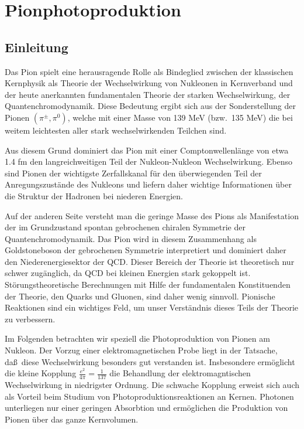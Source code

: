 \chapter{Pionphotoproduktion}
\section{Einleitung}
Das Pion spielt eine herausragende Rolle als Bindeglied zwischen 
der klassischen Kernphysik als Theorie der Wechselwirkung von 
Nukleonen in Kernverband und der heute anerkannten fundamentalen
Theorie der starken Wechselwirkung, der Quantenchromodynamik.  
Diese Bedeutung ergibt sich aus der Sonderstellung der Pionen
$(\pi^\pm,\pi^0)$, welche mit einer Masse von 139 MeV (bzw.~135 MeV)
die bei weitem leichtesten aller stark wechselwirkenden
Teilchen sind. 

Aus diesem Grund dominiert das Pion mit einer Comptonwellenl\"ange
von etwa 1.4 fm den langreichweitigen Teil der Nukleon-Nukleon
Wechselwirkung. Ebenso sind Pionen der wichtigste Zerfallskanal
f\"ur den \"uberwiegenden Teil der Anregungszust\"ande des
Nukleons und liefern daher wichtige Informationen \"uber
die  Struktur der Hadronen bei niederen Energien.

Auf der anderen Seite versteht man die geringe Masse des Pions
als Manifestation der im Grundzustand spontan 
gebrochenen chiralen Symmetrie der Quantenchromodynamik.
Das Pion wird in diesem Zusammenhang als Goldstoneboson der
gebrochenen Symmetrie interpretiert und dominiert daher
den Niederenergiesektor der QCD. Dieser Bereich der Theorie
ist theoretisch nur schwer zug\"anglich, da QCD bei kleinen
Energien stark gekoppelt ist. St\"orungstheoretische
Berechnungen mit Hilfe der fundamentalen Konstituenden der Theorie, den
Quarks und Gluonen, sind daher wenig sinnvoll. Pionische 
Reaktionen  sind ein wichtiges Feld, um 
unser Verst\"andnis dieses Teils der Theorie zu verbessern.

Im Folgenden betrachten wir speziell die Photoproduktion 
von Pionen am Nukleon. Der Vorzug einer elektromagnetischen 
Probe liegt in der Tatsache, da\ss\  diese Wechselwirkung
besonders gut verstanden ist. Insbesondere erm\"oglicht die
kleine Kopplung $\frac{e^2}{4\pi}=\frac{1}{137}$ die Behandlung
der elektromagntischen Wechselwirkung in niedrigster Ordnung. 
Die schwache Kopplung erweist sich auch als Vorteil
beim Studium von Photoproduktionsreaktionen an Kernen.
Photonen unterliegen nur einer geringen Absorbtion und erm\"oglichen 
die Produktion von Pionen \"uber das ganze Kernvolumen.

